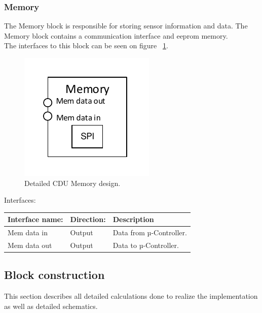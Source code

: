\subsubsection{Memory}
The Memory block is responsible for storing sensor information and data. The Memory block contains a communication interface and eeprom memory.\\
The interfaces to this block can be seen on figure ~\ref{fig:CDUM}.\\
\begin{figure}[H]
	\centering
	\includegraphics[scale=1]{billeder/CDUM}
	\caption{Detailed CDU Memory design.}
	\label{fig:CDUM}
\end{figure}
Interfaces:
\begin{table}[H]
	\centering
	\begin{tabular}{|p{3cm} |p{3cm}| p{8cm}| }
		\hline
		Interface name: & Direction: 	& Description \\ \hline
		Mem data in		&Output & Data from µ-Controller. \\\hline 
		Mem data out	&Output & Data to µ-Controller. \\\hline  
	\end{tabular}
\end{table}

\subsection{Block construction}
This section describes all detailed calculations done to realize the implementation as well as detailed schematics.\\
